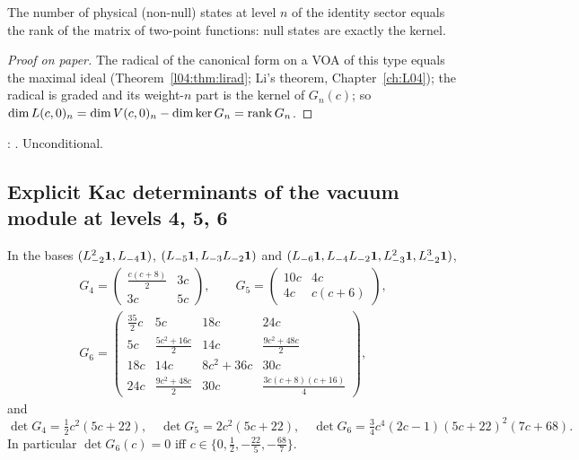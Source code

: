 \begin{physics}
The number of physical (non-null) states at level $n$ of the identity sector equals the rank of the
matrix of two-point functions: null states are exactly the kernel.
\end{physics}

\begin{proof}[Proof on paper]
The radical of the canonical form on a VOA of this type equals the maximal ideal
(Theorem~\ref{l04:thm:lirad}; Li's theorem, Chapter~\ref{ch:L04}); the radical is graded and its
weight-$n$ part is the kernel of $G_n(c)$; so $\dim L(c,0)_n = \dim V(c,0)_n - \dim\ker G_n = \operatorname{rank}G_n$.
\end{proof}

\begin{status}
\allowbreak{}\allowbreak{}\allowbreak{}\allowbreak{}\allowbreak{}: \lean{[propext, Classical.}\allowbreak{}\allowbreak\lean{sound]}. Unconditional.
\end{status}

\subsection{Explicit Kac determinants of the vacuum module at levels 4, 5, 6}

\begin{theorem}\label{l06:thm:gram456}
In the bases $(L_{-2}^2\mathbf{1},L_{-4}\mathbf{1})$, $(L_{-5}\mathbf{1},L_{-3}L_{-2}\mathbf{1})$ and
$(L_{-6}\mathbf{1},L_{-4}L_{-2}\mathbf{1},L_{-3}^2\mathbf{1},L_{-2}^3\mathbf{1})$,
\begin{gather*}
 G_4 = \begin{pmatrix}\frac{c(c+8)}2 & 3c\\ 3c & 5c\end{pmatrix},\qquad
 G_5 = \begin{pmatrix}10c & 4c\\ 4c & c(c+6)\end{pmatrix},\\
 G_6 = \begin{pmatrix}
 \frac{35}2c & 5c & 18c & 24c\\
 5c & \frac{5c^2+16c}2 & 14c & \frac{9c^2+48c}2\\
 18c & 14c & 8c^2+36c & 30c\\
 24c & \frac{9c^2+48c}2 & 30c & \frac{3c(c+8)(c+16)}4
 \end{pmatrix},
\end{gather*}
and
\begin{equation*}
 \det G_4 = \tfrac12c^2(5c+22),\quad \det G_5 = 2c^2(5c+22),\quad
 \det G_6 = \tfrac34c^4(2c-1)(5c+22)^2(7c+68).
\end{equation*}
In particular $\det G_6(c) = 0$ iff $c\in\{0,\frac12,-\frac{22}5,-\frac{68}7\}$.
\end{theorem}

